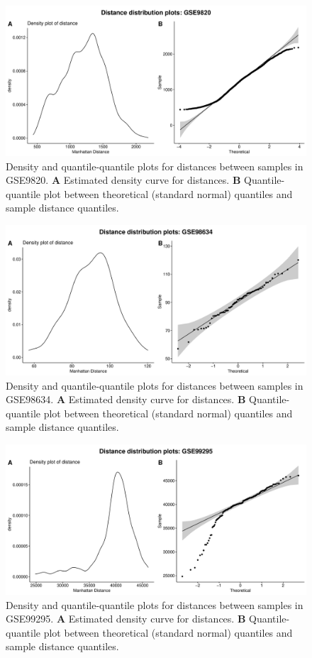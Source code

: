 \documentclass[10pt,letterpaper]{article}\usepackage[]{graphicx}\usepackage[]{color}
\begin{document}
\begin{figure}[H]
	\includegraphics[width=\textwidth]{manhattan-distance_hist_GSE9820.pdf}
	\caption{Density and quantile-quantile plots for distances between samples in GSE9820. \textbf{A} Estimated density curve for distances. \textbf{B} Quantile-quantile plot between theoretical (standard normal) quantiles and sample distance quantiles.}
\end{figure}

\begin{figure}[H]
	\includegraphics[width=\textwidth]{manhattan-distance_hist_GSE98634.pdf}
	\caption{Density and quantile-quantile plots for distances between samples in GSE98634. \textbf{A} Estimated density curve for distances. \textbf{B} Quantile-quantile plot between theoretical (standard normal) quantiles and sample distance quantiles.}
\end{figure}

\begin{figure}[H]
	\includegraphics[width=\textwidth]{manhattan-distance_hist_GSE99295.pdf}
	\caption{Density and quantile-quantile plots for distances between samples in GSE99295. \textbf{A} Estimated density curve for distances. \textbf{B} Quantile-quantile plot between theoretical (standard normal) quantiles and sample distance quantiles.}
\end{figure}
\end{document}
